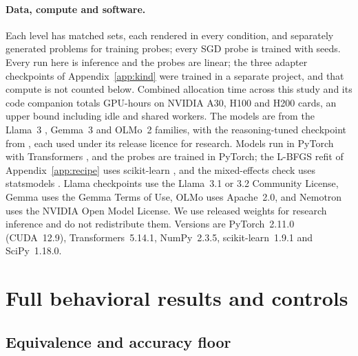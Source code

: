 \paragraph{Data, compute and software.} Each level has  matched sets, each
rendered in every condition, and  separately generated problems for
training probes; every SGD probe is trained with  seeds. Every run here is
inference and the probes are linear; the three adapter checkpoints of Appendix~\ref{app:kind}
were trained in a separate project, and that compute is not counted below. Combined allocation time across this study and its code companion totals  GPU-hours on NVIDIA A30, H100 and H200 cards, an upper bound including idle and shared workers.
The models are from the Llama~3 \citep{grattafiori2024llama3}, Gemma~3 \citep{gemmateam2025gemma3}
and OLMo~2 \citep{olmo2024olmo2,walsh2025olmo2} families, with the reasoning-tuned checkpoint from
\citet{bercovich2025nemotron}, each used under its release licence for research. Models run in
PyTorch \citep{paszke2019pytorch} with Transformers \citep{wolf2020transformers}, and the probes are
trained in PyTorch; the L-BFGS refit of Appendix~\ref{app:recipe} uses scikit-learn
\citep{pedregosa2011sklearn}, and the mixed-effects check uses statsmodels
\citep{seabold2010statsmodels}.
Llama checkpoints use the Llama~3.1 or 3.2 Community License, Gemma uses the Gemma Terms
of Use, OLMo uses Apache~2.0, and Nemotron uses the NVIDIA Open Model License.
We use released weights for research inference and do not redistribute them.
Versions are PyTorch~2.11.0 (CUDA~12.9), Transformers~5.14.1, NumPy~2.3.5,
scikit-learn~1.9.1 and SciPy~1.18.0.

\section{Full behavioral results and controls}
\begin{table}[t]
\centering\small
{}
\caption{The level-3 model below the preregistered 90\% mean neutral-CoT accuracy floor,
excluded from the main behavioral table. Columns and claim markers follow Table~\ref{tab:behavior}.}
\label{tab:excluded}
\end{table}

\subsection{Equivalence and accuracy floor}

